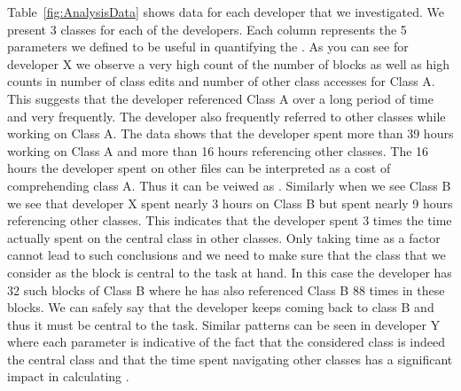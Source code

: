 Table~\ref{fig:AnalysisData} shows data for each developer that we investigated. We present 3 classes for each of the developers. Each column represents the 5 parameters we defined to be useful in quantifying the \TD. As you can see for developer X we observe a very high count of the number of blocks as well as high counts in number of class edits and number of other class accesses for Class A. This suggests that the developer referenced Class A over a long period of time and very frequently. The developer also frequently referred to other classes while working on Class A. The data shows that the developer spent more than 39 hours working on Class A and more than 16 hours referencing other classes. The 16 hours the developer spent on other files can be interpreted as a cost of comprehending class A. Thus it can be veiwed as  \TD. Similarly when we see Class B we see that developer X spent nearly 3 hours on Class B but spent nearly 9 hours referencing other classes. This indicates that the developer spent 3 times the time actually spent on the central class in other classes. Only taking time as a factor cannot lead to such conclusions and we need to make sure that the class that we consider as the block is central to the task at hand. In this case the developer has 32 such blocks of Class B where he has also referenced Class B 88 times in these blocks. We can safely say that the developer keeps coming back to class B and thus it must be central to the task. Similar patterns can be seen in developer Y where each parameter is indicative of the fact that the considered class is indeed the central class and that the time spent navigating other classes has a significant impact in calculating \TD.
